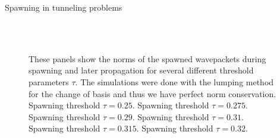 \begin{chapter}{Spawning in tunneling problems}
\begin{figure}[h!]
{  } \\
   \\
  \caption[Norm of the spawned wavepackets during spawning and later propagation]{
  These panels show the norms of the spawned wavepackets during spawning and later propagation
  for several different threshold parameters $\tau$. The simulations were done with the lumping
  method for the change of basis and thus we have perfect norm conservation.
   Spawning threshold $\tau = 0.25$.
   Spawning threshold $\tau = 0.275$.
   Spawning threshold $\tau = 0.29$.
   Spawning threshold $\tau = 0.31$.
   Spawning threshold $\tau = 0.315$.
   Spawning threshold $\tau = 0.32$.
  \label{fig:spawn_propag_K100_spawn_threshold_norms_spawn}
  }
\end{figure}



\end{chapter}
